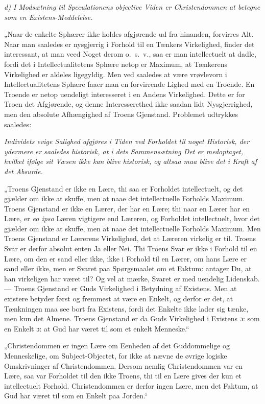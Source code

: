 \begin{center}
\emph{d) I Modsætning til Speculationens objective Viden er
Christendommen at betegne som en Existens-Meddelelse.}
\end{center}

„Naar de enkelte Sphærer ikke holdes afgjørende ud fra hinanden,
forvirres Alt. Naar man saaledes er nysgjerrig i Forhold til en
Tænkers Virkelighed, finder det interessant, at man veed Noget
derom o.\ s.\ v., saa er man intellectuelt at dadle, fordi det i
Intellectualitetens Sphære netop er Maximum, at Tænkerens
Virkelighed er aldeles ligegyldig. Men ved saaledes at være
vrøvlevorn i Intellectualitetens Sphære faaer man en forvirrende
Lighed med en Troende. En Troende er netop uendeligt interesseret
i en Andens Virkelighed. Dette er for Troen det Afgjørende, og
denne Interesserethed ikke saadan lidt Nysgjerrighed, men den
absolute Afhængighed af Troens Gjenstand. Problemet udtrykkes
saaledes:

\emph{Individets evige Salighed afgjøres i Tiden ved Forholdet til
noget Historisk, der ydermere er saaledes historisk, at i dets
Sammensætning Det er medoptaget, hvilket ifølge sit Væsen ikke kan
blive historisk, og altsaa maa blive det i Kraft af det Absurde.}

„Troens Gjenstand er ikke en Lære, thi saa er Forholdet
intellectuelt, og det gjælder om ikke at skuffe,
 men at naae det intellectuelle Forholds Maximum. Troens Gjenstand
er ikke en Lærer, der har en Lære; thi naar en Lærer har en Lære,
er \textit{eo ipso} Læren vigtigere end Læreren, og Forholdet
intellectuelt, hvor det gjælder om ikke at skuffe, men at naae det
intellectuelle Forholds Maximum. Men Troens Gjenstand er Lærerens
Virkelighed, det at Læreren virkelig er til. Troens Svar er derfor
absolut enten Ja eller Nei. Thi Troens Svar er ikke i Forhold til
en Lære, om den er sand eller ikke, ikke i Forhold til en Lærer,
om hans Lære er sand eller ikke, men er Svaret paa Spørgsmaalet om
et Faktum: antager Du, at han virkeligen har været til? Og vel at
mærke, Svaret er med uendelig Lidenskab. --- Troens Gjenstand er
Guds Virkelighed i Betydning af Existens. Men at existere betyder
først og fremmest at være en Enkelt, og derfor er det, at
Tænkningen maa see bort fra Existens, fordi det Enkelte ikke lader
sig tænke, men kun det Almene. Troens Gjenstand er da Guds
Virkelighed i Existens ɔ: som en Enkelt ɔ: at Gud har været til
som et enkelt Menneske.“

„Christendommen er ingen Lære om Eenheden af det Guddommelige og
Menneskelige, om Subject-Objectet, for ikke at nævne de øvrige
logiske Omskrivninger af Christendommen. Dersom nemlig
Christendommen var en Lære, saa var Forholdet til den ikke Troens,
thi til en Lære gives der kun et intellectuelt Forhold.
Christendommen er derfor ingen Lære, men det Faktum, at Gud har
været til som en Enkelt paa Jorden.“


